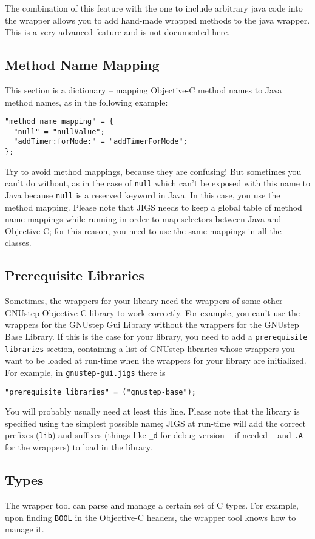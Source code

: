 The combination of this feature with the one to include arbitrary java
code into the wrapper allows you to add hand-made wrapped methods to
the java wrapper.  This is a very advanced feature and is not
documented here.

\subsection{Method Name Mapping}
This section is a dictionary -- mapping Objective-C method names 
to Java method names, as in the following example:
\begin{verbatim}
"method name mapping" = {
  "null" = "nullValue";
  "addTimer:forMode:" = "addTimerForMode";
};
\end{verbatim}
Try to avoid method mappings, because they are confusing!  But
sometimes you can't do without, as in the case of \texttt{null} which
can't be exposed with this name to Java because \texttt{null} is a
reserved keyword in Java.  In this case, you use the method mapping.
Please note that JIGS needs to keep a global table of method name
mappings while running in order to map selectors between Java and
Objective-C; for this reason, you need to use the same mappings in all
the classes.

\subsection{Prerequisite Libraries}
Sometimes, the wrappers for your library need the wrappers of some
other GNUstep Objective-C library to work correctly.  For example, you
can't use the wrappers for the GNUstep Gui Library without the
wrappers for the GNUstep Base Library.  If this is the case for your
library, you need to add a \texttt{prerequisite libraries} section,
containing a list of GNUstep libraries whose wrappers you want to be
loaded at run-time when the wrappers for your library are initialized.
For example, in \texttt{gnustep-gui.jigs} there is
\begin{verbatim}
"prerequisite libraries" = ("gnustep-base");
\end{verbatim}
You will probably usually need at least this line.  Please note that
the library is specified using the simplest possible name; JIGS at
run-time will add the correct prefixes (\texttt{lib}) and suffixes
(things like \texttt{\_d} for debug version -- if needed -- and
\texttt{.A} for the wrappers) to load in the library.

\subsection{Types}
The wrapper tool can parse and manage a certain set of C types.  For
example, upon finding \texttt{BOOL} in the Objective-C headers, the
wrapper tool knows how to manage it.


